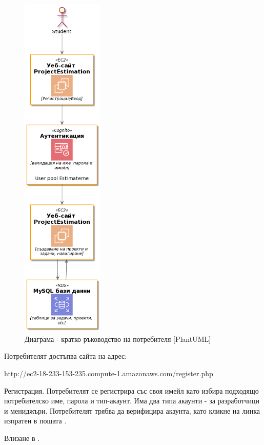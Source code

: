 \documentclass[12pt]{article}
\begin{document}
\begin{figure}
  \centering
  \includegraphics[width=0.35\textwidth]{81426_fig1.png}
    \caption{Диаграма - кратко ръководство на потребителя [PlantUML]}
\end{figure}


Потребителят достъпва сайта на адрес:
  
  \medskip http://ec2-18-233-153-235.compute-1.amazonaws.com/register.php


Регистрация. Потребителят се регистрира със своя имейл като избира подходящо потребителско име, парола и тип-акаунт. Има два типа акаунти - за разработчици и мениджъри. Потребителят трябва да верифицира акаунта, като кликне на линка изпратен в пощата .

Влизане в .
\end{document}
